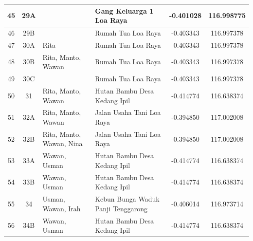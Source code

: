 \begin{landscape}
{\begin{tabularx}{\textwidth}{|c|c|l|l|c|c|}
            45 & 29A            &                                                              & Gang Keluarga 1 Loa Raya           & -0.401028         & 116.998775         \\ \hline
            46 & 29B            &                                                              & Rumah Tua Loa Raya                 & -0.403343         & 116.997378         \\ \hline
            47 & 30A            & Rita                                                         & Rumah Tua Loa Raya                 & -0.403343         & 116.997378         \\ \hline
            48 & 30B            & Rita, Manto, Wawan                                           & Rumah Tua Loa Raya                 & -0.403343         & 116.997378         \\ \hline
            49 & 30C            &                                                              & Rumah Tua Loa Raya                 & -0.403343         & 116.997378         \\ \hline
            50 & 31             & Rita, Manto, Wawan                                           & Hutan Bambu Desa Kedang Ipil       & -0.414774         & 116.638374         \\ \hline
            51 & 32A            & Rita, Manto, Wawan                                           & Jalan Usaha Tani Loa Raya          & -0.394850         & 117.002008         \\ \hline
            52 & 32B            & Rita, Manto, Wawan, Nina                                     & Jalan Usaha Tani Loa Raya          & -0.394850         & 117.002008         \\ \hline
            53 & 33A            & Wawan, Usman                                                 & Hutan Bambu Desa Kedang Ipil       & -0.414774         & 116.638374         \\ \hline
            54 & 33B            & Wawan, Usman                                                 & Hutan Bambu Desa Kedang Ipil       & -0.414774         & 116.638374         \\ \hline
            55 & 34             & Usman, Wawan, Irah                                           & Kebun Bunga Waduk Panji Tenggarong & -0.406014         & 116.973714         \\ \hline
            56 & 34B            & Wawan, Usman                                                 & Hutan Bambu Desa Kedang Ipil       & -0.414774         & 116.638374         \\ \hline

\end{tabularx}}
\end{landscape}
